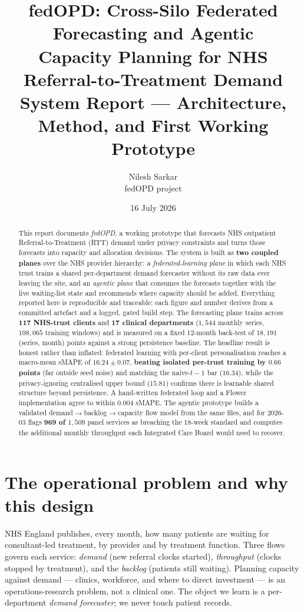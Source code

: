 \documentclass[11pt,a4paper]{article}
\title{\textbf{fedOPD: Cross-Silo Federated Forecasting and Agentic\\ Capacity Planning for NHS Referral-to-Treatment Demand}\\[0.4em]
\large System Report --- Architecture, Method, and First Working Prototype}
\author{Nilesh Sarkar \\ \small fedOPD project}
\date{16 July 2026}
\begin{document}
\maketitle

\begin{abstract}
This report documents \emph{fedOPD}, a working prototype that forecasts NHS outpatient
Referral-to-Treatment (RTT) demand under privacy constraints and turns those forecasts into
capacity and allocation decisions. The system is built as \textbf{two coupled planes} over the NHS
provider hierarchy: a \emph{federated-learning plane} in which each NHS trust trains a shared
per-department demand forecaster without its raw data ever leaving the site, and an \emph{agentic
plane} that consumes the forecasts together with the live waiting-list state and recommends where
capacity should be added. Everything reported here is reproducible and traceable: each figure and
number derives from a committed artefact and a logged, gated build step. The forecasting plane trains
across \textbf{117 NHS-trust clients} and \textbf{17 clinical departments} ($1{,}544$ monthly series,
$108{,}065$ training windows) and is measured on a fixed 12-month back-test of $18{,}191$
(series, month) points against a strong persistence baseline. The headline result is honest rather
than inflated: federated learning with per-client personalisation reaches a macro-mean sMAPE of
$16.24\pm0.07$, \textbf{beating isolated per-trust training by $0.66$ points} (far outside seed noise)
and matching the naive-$t{-}1$ bar ($16.34$), while the privacy-ignoring centralised upper bound
($15.81$) confirms there is learnable shared structure beyond persistence. A hand-written federated
loop and a Flower implementation agree to within $0.004$ sMAPE. The agentic prototype builds a
validated demand$\rightarrow$backlog$\rightarrow$capacity flow model from the same files, and for
2026-03 flags \textbf{969 of $1{,}509$} panel services as breaching the 18-week standard and computes
the additional monthly throughput each Integrated Care Board would need to recover.
\end{abstract}

\tableofcontents
\clearpage

\section{The operational problem and why this design}\label{sec:intro}
NHS England publishes, every month, how many patients are waiting for consultant-led treatment, by
provider and by treatment function. Three flows govern each service: \emph{demand} (new referral
clocks started), \emph{throughput} (clocks stopped by treatment), and the \emph{backlog} (patients
still waiting). Planning capacity against demand --- clinics, workforce, and where to direct
investment --- is an operations-research problem, not a clinical one. The object we learn is a
per-department \emph{demand forecaster}; we never touch patient records.
\end{document}
